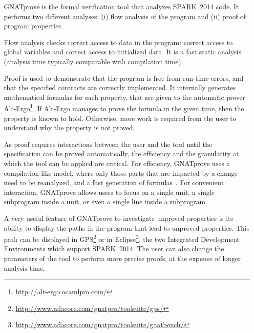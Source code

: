 \documentclass[10pt,a4paper,twocolumn]{article}
\newcommand{\DOC}{\textsc{do-178c}\xspace}
\newcommand{\gnatprove}{GNATprove\xspace}
\newcommand{\newspark}{SPARK~2014\xspace}
\newcommand{\altergo}{Alt-Ergo\xspace}
\begin{document}
\gnatprove is the formal verification tool that analyzes \newspark
code. It performs two different analyses: (i) flow analysis of the
program and (ii) proof of program properties.

Flow analysis checks correct access to data in the program: correct
access to global variables
and correct access to initialized data. It is a fast static analysis
(analysis time typically comparable with compilation time).

Proof is used to demonstrate that the program is free from run-time
errors, and that the specified contracts are correctly implemented. It
internally generates mathematical formulas for each property, that are
given to the automatic prover
\altergo\footnote{\url{http://alt-ergo.ocamlpro.com/}}. If \altergo
manages to prove the formula in the given time, then the property is
known to hold. Otherwise, more work is required from the user to
understand why the property is not proved.

As proof requires interactions between the user and the tool until the
specification can be proved automatically, the efficiency and the
granularity at which the tool can be applied are critical. For
efficiency, \gnatprove uses a compilation-like model, where only those
parts that are impacted by a change need to be reanalyzed, and a fast
generation of formulas~\cite{leino:2005:ipl}.  For convenient
interaction, \gnatprove allows users to focus on a single unit, a single
subprogram inside a unit, or even a single line inside a
subprogram.

A very useful feature of \gnatprove to investigate unproved properties
is its ability to display the paths in the program that lead to
unproved properties. This path can be displayed in
GPS\footnote{\url{http://www.adacore.com/gnatpro/toolsuite/gps/}} or
in
Eclipse\footnote{\url{http://www.adacore.com/gnatpro/toolsuite/gnatbench/}},
the two Integrated Development Environments which support
\newspark. The user can also change the parameters of the tool to
perform more precise proofs, at the expense of longer analysis time.


\end{document}
